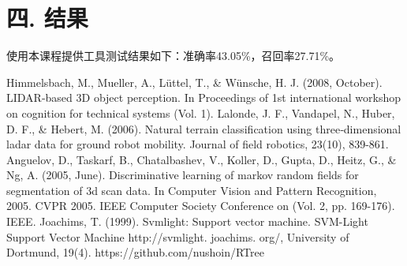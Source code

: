 \documentclass[12pt]{article}
\begin{document}
  \section*{四. 结果}
  	使用本课程提供工具测试结果如下：准确率43.05\%，召回率27.71\%。
  \begin{thebibliography}{3}
 	Himmelsbach, M., Mueller, A., Lüttel, T., \& Wünsche, H. J. (2008, October). LIDAR-based 3D object perception. In Proceedings of 1st international workshop on cognition for technical systems (Vol. 1).
  	Lalonde, J. F., Vandapel, N., Huber, D. F., \& Hebert, M. (2006). Natural terrain classification using three‐dimensional ladar data for ground robot mobility. Journal of field robotics, 23(10), 839-861.
  	Anguelov, D., Taskarf, B., Chatalbashev, V., Koller, D., Gupta, D., Heitz, G., \& Ng, A. (2005, June). Discriminative learning of markov random fields for segmentation of 3d scan data. In Computer Vision and Pattern Recognition, 2005. CVPR 2005. IEEE Computer Society Conference on (Vol. 2, pp. 169-176). IEEE.
  	Joachims, T. (1999). Svmlight: Support vector machine. SVM-Light Support Vector Machine http://svmlight. joachims. org/, University of Dortmund, 19(4).
  	https://github.com/nushoin/RTree
  \end{thebibliography}
 
\end{document}
